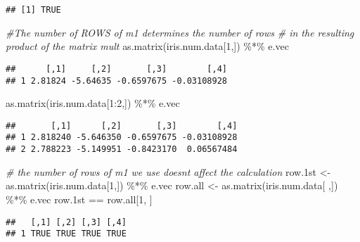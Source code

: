 \documentclass[
]{book}
\newenvironment{Shaded}{\begin{snugshade}}{\end{snugshade}}
\newcommand{\CommentTok}[1]{\textcolor[rgb]{0.56,0.35,0.01}{\textit{#1}}}
\newcommand{\DecValTok}[1]{\textcolor[rgb]{0.00,0.00,0.81}{#1}}
\newcommand{\FloatTok}[1]{\textcolor[rgb]{0.00,0.00,0.81}{#1}}
\newcommand{\FunctionTok}[1]{\textcolor[rgb]{0.00,0.00,0.00}{#1}}
\newcommand{\NormalTok}[1]{#1}
\newcommand{\OtherTok}[1]{\textcolor[rgb]{0.56,0.35,0.01}{#1}}
\newcommand{\SpecialCharTok}[1]{\textcolor[rgb]{0.00,0.00,0.00}{#1}}
\begin{document}
\begin{verbatim}
## [1] TRUE
\end{verbatim}

\begin{Shaded}
\begin{Highlighting}[]
\CommentTok{\#The number of ROWS of m1 determines the number of rows}
\CommentTok{\# in the resulting product of the matrix mult}
\FunctionTok{as.matrix}\NormalTok{(iris.num.data[}\DecValTok{1}\NormalTok{,]) }\SpecialCharTok{\%*\%}\NormalTok{ e.vec}
\end{Highlighting}
\end{Shaded}

\begin{verbatim}
##      [,1]     [,2]       [,3]        [,4]
## 1 2.81824 -5.64635 -0.6597675 -0.03108928
\end{verbatim}

\begin{Shaded}
\begin{Highlighting}[]
\FunctionTok{as.matrix}\NormalTok{(iris.num.data[}\DecValTok{1}\SpecialCharTok{:}\DecValTok{2}\NormalTok{,]) }\SpecialCharTok{\%*\%}\NormalTok{ e.vec}
\end{Highlighting}
\end{Shaded}

\begin{verbatim}
##       [,1]      [,2]       [,3]        [,4]
## 1 2.818240 -5.646350 -0.6597675 -0.03108928
## 2 2.788223 -5.149951 -0.8423170  0.06567484
\end{verbatim}

\begin{Shaded}
\begin{Highlighting}[]
\CommentTok{\# the number of rows of m1 we use doesn\textquotesingle{}t affect the calculation}
\NormalTok{row}\FloatTok{.1}\NormalTok{st }\OtherTok{\textless{}{-}} \FunctionTok{as.matrix}\NormalTok{(iris.num.data[}\DecValTok{1}\NormalTok{,]) }\SpecialCharTok{\%*\%}\NormalTok{ e.vec}
\NormalTok{row.all }\OtherTok{\textless{}{-}} \FunctionTok{as.matrix}\NormalTok{(iris.num.data[ ,]) }\SpecialCharTok{\%*\%}\NormalTok{ e.vec}
\NormalTok{row}\FloatTok{.1}\NormalTok{st }\SpecialCharTok{==}\NormalTok{ row.all[}\DecValTok{1}\NormalTok{, ]}
\end{Highlighting}
\end{Shaded}

\begin{verbatim}
##   [,1] [,2] [,3] [,4]
## 1 TRUE TRUE TRUE TRUE
\end{verbatim}
\end{document}

